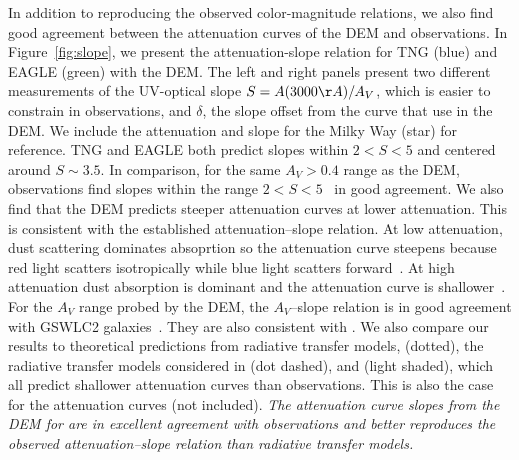 In addition to reproducing the observed color-magnitude relations, we
also find good agreement between the attenuation curves of the DEM and
observations. In Figure~\ref{fig:slope}, we present the attenuation-slope
relation for TNG (blue) and EAGLE (green) with the DEM.
The left and right panels present two different measurements of the UV-optical slope $S =
A(3000\AA)/A_V$, which is easier to constrain in observations, and $\delta$,
the slope offset from the \cite{calzetti2001} curve that use in the DEM. 
We include the attenuation and slope for the Milky Way (star) for reference.
TNG and EAGLE both predict slopes within $2 < S < 5$ and centered around $S\sim
3.5$. In comparison, for the same $A_V > 0.4$ range as the DEM, observations 
find slopes within the range $2 < S < 5$~\citep{calzetti2000, burgarella2005, johnson2007,
conroy2010b, wild2011, battisti2016, battisti2017, leja2017, salim2018} in good
agreement. We also find that the DEM predicts steeper attenuation curves at 
lower attenuation. This is consistent with the established attenuation--slope
relation. At low attenuation, dust scattering dominates absoprtion so the 
attenuation curve steepens because red light scatters isotropically while blue light
scatters forward~\citep{gordon1994, witt2000, draine2003}. %
At high attenuation dust absorption is dominant and the attenuation curve is
shallower~\citep{chevallard2013}. For the $A_V$ range probed by the DEM, the
$A_V$--slope relation is in good agreement with GSWLC2 galaxies~\citep[black shaded][]{salim2020}.
They are also consistent with \cite{leja2017}. We also compare our results to
theoretical predictions from radiative transfer models, \cite{inoue2005}
(dotted), the radiative transfer models considered in \cite{chevallard2013}
(dot dashed), and \cite{trayford2020} (light shaded), which all predict shallower 
attenuation curves than observations. This is also the case for the
\cite{narayanan2018} attenuation curves (not included). 
\emph{The attenuation curve slopes from the DEM for are in excellent
agreement with observations and better reproduces the observed
attenuation--slope relation than radiative transfer models.}


